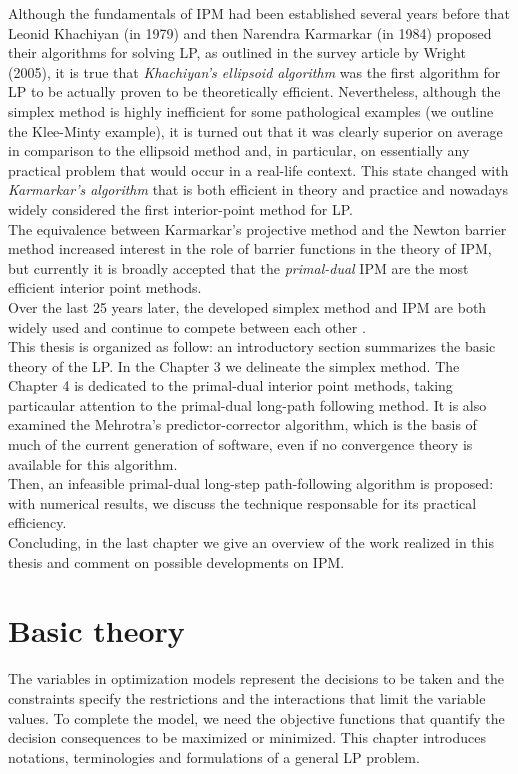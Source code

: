 \documentclass[a4paper,10 pt,titlepage,twoside]{book}
\theoremstyle{plain}
\theoremstyle{definition}
\theoremstyle{remark}
\begin{document}
Although the fundamentals of IPM had been established several years before that Leonid Khachiyan (in 1979) and then Narendra Karmarkar (in 1984) proposed their algorithms for solving LP, as outlined in the survey article by Wright (2005), it is true that \textit{Khachiyan’s ellipsoid algorithm} was the first algorithm for LP to be actually proven to be theoretically efficient. Nevertheless, although the simplex method is highly inefficient for some pathological examples (we outline the Klee-Minty example), it is turned out that it was clearly superior on average in comparison to the ellipsoid method and, in particular, on essentially any practical problem that would occur in a real-life context. This state changed with \textit{Karmarkar’s algorithm} that is both efficient in theory and practice and nowadays widely considered the first interior-point method for LP.\\
The equivalence between Karmarkar's projective method and the Newton barrier method increased interest in the role of barrier functions in the theory of IPM, but currently it is broadly accepted that the \textit{primal-dual} IPM are the most efficient interior point methods.\\
Over the last 25 years later, the developed simplex method and IPM are both widely used and continue to compete between each other \cite{25y}. \\
This thesis is organized as follow: an introductory section summarizes the basic theory of the LP. In the Chapter 3 we delineate the simplex method. The Chapter 4 is dedicated to the primal-dual interior point methods, taking particaular attention to the primal-dual long-path following method. It is also examined the Mehrotra's predictor-corrector algorithm, which is the basis of much of the current generation of software, even if no convergence theory is available for this algorithm.\\
Then, an infeasible primal-dual long-step path-following algorithm is proposed: with numerical results, we discuss the technique responsable for its practical efficiency.\\
Concluding, in the last chapter we give an overview of the work realized in this thesis and comment on possible developments on IPM. 

%
%

\chapter{Basic theory}
The variables in optimization models represent the decisions to be taken and the constraints specify the restrictions and the interactions that limit the variable values.
To complete the model, we need the objective functions that quantify the decision consequences to be maximized or minimized. This chapter introduces notations, terminologies and formulations of a general LP problem.
\end{document}
